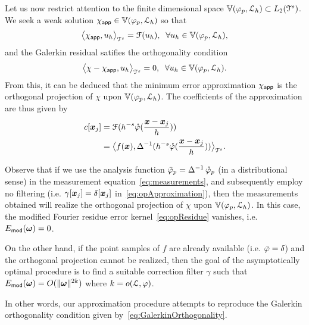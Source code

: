 Let us now restrict attention to the finite dimensional space $\aspace{\lattice{L}_h}{\varphi_p} \subset L_2(\cube^s)$. 
We seek a weak solution $\appf{\chi} \in \aspace{\lattice{L}_h}{\varphi_p}$ so that
\begin{equation}
  \innerproduct{\appf{\chi}}{u_h} = \mathcal{F}(u_h), \;\;
  \forall u_h \in \aspace{\lattice{L}_h}{\varphi_p},
\end{equation}
and the Galerkin residual satifies the orthogonality condition
\begin{equation}
  \innerproduct{\chi - \appf{\chi}}{u_h} = 0, \;\;
  \forall u_h \in \aspace{\lattice{L}_h}{\varphi_p}.
  \label{eq:GalerkinOrthogonality}
\end{equation}
From this, it can be deduced that the minimum error approximation $\appf{\chi}$ is the orthogonal projection of $\chi$ upon $\aspace{\lattice{L}_h}{\varphi_p}$. 
The coefficients of the approximation are thus given by
\begin{equation}
  \begin{split}
    c[\vect{x}_j] & = \mathcal{F}(h^{-s}
    \dual{\varphi}(\frac{\vect{x}-\vect{x}_j}{h})) \\
    & = 
    \innerproduct{f(\vect{x})}{\invlaplacian(h^{-s}\dual{\varphi}(\frac{\vect{x}-\vect{x}_j}{h}))}.
  \end{split}
\end{equation}

Observe that if we use the analysis function $\analysis{\varphi}_p = \invlaplacian \dual{\varphi}_p$ (in a distributional sense) in the measurement equation~\eqref{eq:measurements}, and subsequently employ no filtering (i.e. $\gamma[\vect{x}_j] = \delta[\vect{x}_j]$ in~\eqref{eq:opApproximation}), then the measurements obtained will realize the orthogonal projection of $\chi$ upon $\aspace{\lattice{L}_h}{\varphi_p}$. 
In this case, the modified Fourier residue error kernel~\eqref{eq:opResidue} vanishes, i.e. $E_{\mathsf{mod}}(\vect{\omega}) = 0$.

On the other hand, if the point samples of $f$ are already available (i.e. $\analysis{\varphi} = \delta$) and the orthogonal projection cannot be realized, then the goal of the asymptotically optimal
procedure is to find a suitable correction filter $\gamma$ such that $E_{\mathsf{mod}}(\vect{\omega}) = O(\norm{\vect{\omega}}^{2k})$ where $k = \order{\lattice{L}}{\varphi}$.  

In other words, our approximation procedure attempts to reproduce the Galerkin orthogonality condition given by~\eqref{eq:GalerkinOrthogonality}. %

